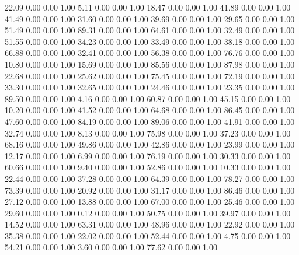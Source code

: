    22.09   0.00   0.00   1.00
    5.11   0.00   0.00   1.00
   18.47   0.00   0.00   1.00
   41.89   0.00   0.00   1.00
   41.49   0.00   0.00   1.00
   31.60   0.00   0.00   1.00
   39.69   0.00   0.00   1.00
   29.65   0.00   0.00   1.00
   51.49   0.00   0.00   1.00
   89.31   0.00   0.00   1.00
   64.61   0.00   0.00   1.00
   32.49   0.00   0.00   1.00
   51.55   0.00   0.00   1.00
   34.23   0.00   0.00   1.00
   33.49   0.00   0.00   1.00
   38.18   0.00   0.00   1.00
   66.88   0.00   0.00   1.00
   32.41   0.00   0.00   1.00
   56.38   0.00   0.00   1.00
   76.76   0.00   0.00   1.00
   10.80   0.00   0.00   1.00
   15.69   0.00   0.00   1.00
   85.56   0.00   0.00   1.00
   87.98   0.00   0.00   1.00
   22.68   0.00   0.00   1.00
   25.62   0.00   0.00   1.00
   75.45   0.00   0.00   1.00
   72.19   0.00   0.00   1.00
   33.30   0.00   0.00   1.00
   32.65   0.00   0.00   1.00
   24.46   0.00   0.00   1.00
   23.35   0.00   0.00   1.00
   89.50   0.00   0.00   1.00
    4.16   0.00   0.00   1.00
   60.87   0.00   0.00   1.00
   45.15   0.00   0.00   1.00
   10.20   0.00   0.00   1.00
   41.52   0.00   0.00   1.00
   64.68   0.00   0.00   1.00
   86.45   0.00   0.00   1.00
   47.60   0.00   0.00   1.00
   84.19   0.00   0.00   1.00
   89.06   0.00   0.00   1.00
   41.91   0.00   0.00   1.00
   32.74   0.00   0.00   1.00
    8.13   0.00   0.00   1.00
   75.98   0.00   0.00   1.00
   37.23   0.00   0.00   1.00
   68.16   0.00   0.00   1.00
   49.86   0.00   0.00   1.00
   42.86   0.00   0.00   1.00
   23.99   0.00   0.00   1.00
   12.17   0.00   0.00   1.00
    6.99   0.00   0.00   1.00
   76.19   0.00   0.00   1.00
   30.33   0.00   0.00   1.00
   60.66   0.00   0.00   1.00
    9.40   0.00   0.00   1.00
   52.86   0.00   0.00   1.00
   10.33   0.00   0.00   1.00
   22.44   0.00   0.00   1.00
   37.28   0.00   0.00   1.00
   64.39   0.00   0.00   1.00
   78.27   0.00   0.00   1.00
   73.39   0.00   0.00   1.00
   20.92   0.00   0.00   1.00
   31.17   0.00   0.00   1.00
   86.46   0.00   0.00   1.00
   27.12   0.00   0.00   1.00
   13.88   0.00   0.00   1.00
   67.00   0.00   0.00   1.00
   25.46   0.00   0.00   1.00
   29.60   0.00   0.00   1.00
    0.12   0.00   0.00   1.00
   50.75   0.00   0.00   1.00
   39.97   0.00   0.00   1.00
   14.52   0.00   0.00   1.00
   63.31   0.00   0.00   1.00
   48.96   0.00   0.00   1.00
   22.92   0.00   0.00   1.00
   35.38   0.00   0.00   1.00
   22.02   0.00   0.00   1.00
   52.44   0.00   0.00   1.00
    4.75   0.00   0.00   1.00
   54.21   0.00   0.00   1.00
    3.60   0.00   0.00   1.00
   77.62   0.00   0.00   1.00

